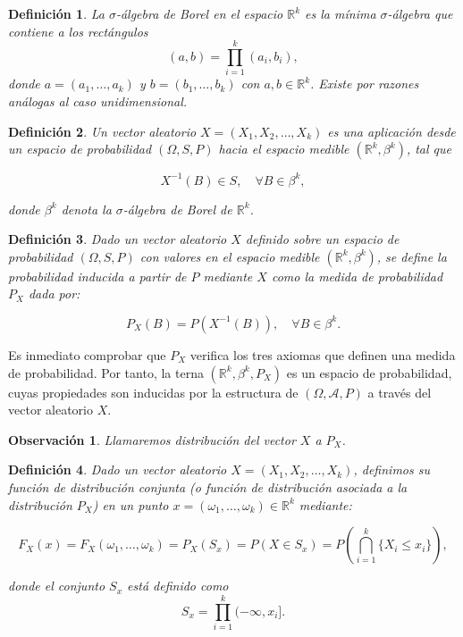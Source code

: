 \documentclass{report}
\newtheorem{dfn}{Definición}[section]
\newtheorem{obs}{Observación}[section]
\begin{document}
\begin{dfn}
La \emph{$\sigma$-álgebra de Borel} en el espacio \( \mathbb{R}^k \) es la mínima $\sigma$-álgebra que contiene a los rectángulos
\[
(a, b) = \prod_{i=1}^{k} (a_i, b_i),
\]
donde \( a = (a_1, \dots, a_k) \) y \( b = (b_1, \dots, b_k) \) con \( a, b \in \mathbb{R}^k \). Existe por razones análogas
al caso unidimensional.
\end{dfn}


\begin{dfn}
Un \emph{vector aleatorio} \( X = (X_1, X_2, \dots, X_k) \) es una aplicación desde un espacio de probabilidad \( (\Omega, S, P) \) 
hacia el espacio medible \( (\mathbb{R}^k, \beta^k) \), tal que

\[
X^{-1}(B) \in S, \quad \forall B \in \beta^k,
\]

donde \( \beta^k \) denota la \(\sigma\)-álgebra de Borel de \( \mathbb{R}^k \).
\end{dfn}

\begin{dfn}
Dado un vector aleatorio \( X \) definido sobre un espacio de probabilidad \( (\Omega, S, P) \) 
con valores en el espacio medible \( (\mathbb{R}^k, \beta^k) \), se define la \emph{probabilidad inducida} 
a partir de \( P \) mediante \( X \) como la medida de probabilidad \( P_X \) dada por:

\begin{equation}
P_X(B) = P(X^{-1}(B)), \quad \forall B \in \beta^k. \tag{3.1}
\end{equation}
\end{dfn}


Es inmediato comprobar que \( P_X \) verifica los tres axiomas que definen una medida de probabilidad. Por tanto, 
la terna \( (\mathbb{R}^k, \beta^k, P_X) \) es un espacio de probabilidad, cuyas propiedades son inducidas 
por la estructura de \( (\Omega, \mathcal{A}, P) \) a través del vector aleatorio \( X \).

\begin{obs}
    Llamaremos \emph{distribución} del vector \( X \) a \( P_X \).
\end{obs}

\begin{dfn}
Dado un vector aleatorio \( X = (X_1, X_2, \dots, X_k) \), definimos su \textit{función de distribución conjunta}
 (o \textit{función de distribución asociada} a la distribución \( P_X \)) en un punto \( x = (\omega_1, \dots, \omega_k) \in \mathbb{R}^k \) mediante:

\begin{equation*}
F_X(x) = F_X(\omega_1, \dots, \omega_k) = P_X(S_x) = P(X \in S_x) = P\left( \bigcap_{i=1}^{k} \{ X_i \leq x_i \} \right),
\end{equation*}

donde el conjunto \( S_x \) está definido como
\[
S_x = \prod_{i=1}^{k} (-\infty, x_i].
\]
\end{dfn}
\end{document}
